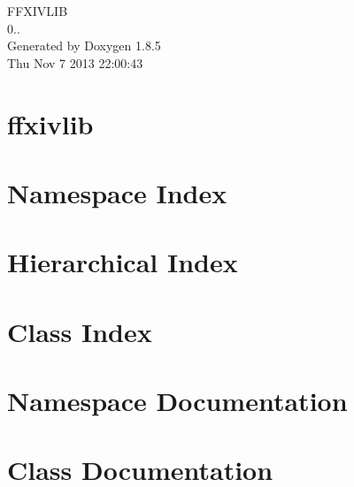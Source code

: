 \documentclass[twoside]{book}
\newcommand{\clearemptydoublepage}{%
  \newpage{\pagestyle{empty}\cleardoublepage}%
}
\begin{document}
\hypersetup{pageanchor=false}
\begin{titlepage}
\vspace*{7cm}
\begin{center}%
{\Large F\-F\-X\-I\-V\-L\-I\-B \\[1ex]\large 0.. }\\
\vspace*{1cm}
{\large Generated by Doxygen 1.8.5}\\
\vspace*{0.5cm}
{\small Thu Nov 7 2013 22:00:43}\\
\end{center}
\end{titlepage}
\clearemptydoublepage
\tableofcontents
\clearemptydoublepage
{}
\hypersetup{pageanchor=true}

\chapter{ffxivlib}
\label{md__r_e_a_d_m_e}
\hypertarget{md__r_e_a_d_m_e}{}

\chapter{Namespace Index}

\chapter{Hierarchical Index}

\chapter{Class Index}

\chapter{Namespace Documentation}








\chapter{Class Documentation}


















\newpage
{}
{}
\printindex
\end{document}
